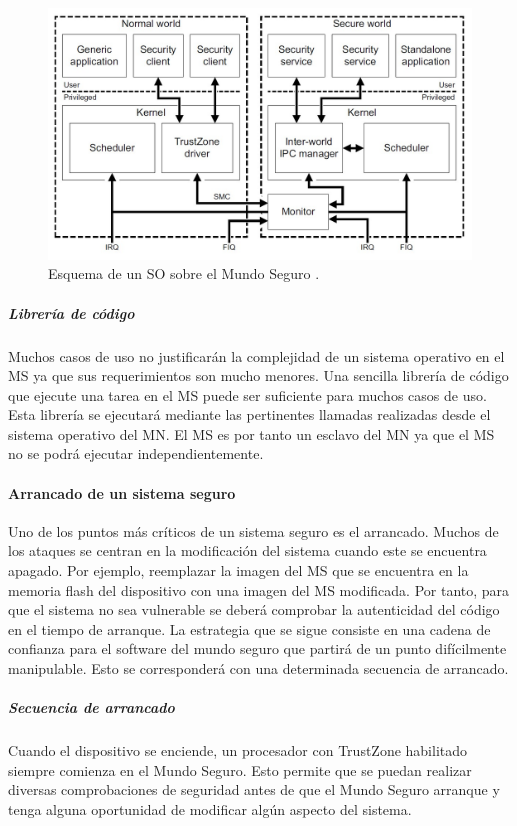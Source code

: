 \begin{figure}
	\centering
	\includegraphics[width=1\textwidth]{imagenes/secureSO.jpg}
	\caption{\label{fig1}Esquema de un SO sobre el Mundo Seguro \cite{trustzone}.}
\end{figure}

\subparagraph{Librería de código}
Muchos casos de uso no justificarán la complejidad de un sistema operativo en el MS ya que sus requerimientos son mucho menores. Una sencilla librería de código que ejecute una tarea en el MS puede ser suficiente para muchos casos de uso. Esta librería se ejecutará mediante las pertinentes llamadas realizadas desde el sistema operativo del MN. El MS es por tanto un esclavo del MN ya que el MS no se podrá ejecutar independientemente.

\paragraph{Arrancado de un sistema seguro}
Uno de los puntos más críticos de un sistema seguro es el arrancado. Muchos de los ataques se centran en la modificación del sistema cuando este se encuentra apagado. Por ejemplo, reemplazar la imagen del MS que se encuentra en la memoria flash del dispositivo con una imagen del MS modificada. Por tanto, para que el sistema no sea vulnerable se deberá comprobar la autenticidad del código en el tiempo de arranque. La estrategia que se sigue consiste en una cadena de confianza para el software del mundo seguro que partirá de un punto difícilmente manipulable. Esto se corresponderá con una determinada secuencia de arrancado.

\subparagraph{Secuencia de arrancado}
Cuando el dispositivo se enciende, un procesador con TrustZone habilitado siempre comienza en el Mundo Seguro. Esto permite que se puedan realizar diversas comprobaciones de seguridad antes de que el Mundo Seguro arranque y tenga alguna oportunidad de modificar algún aspecto del sistema.\newline

